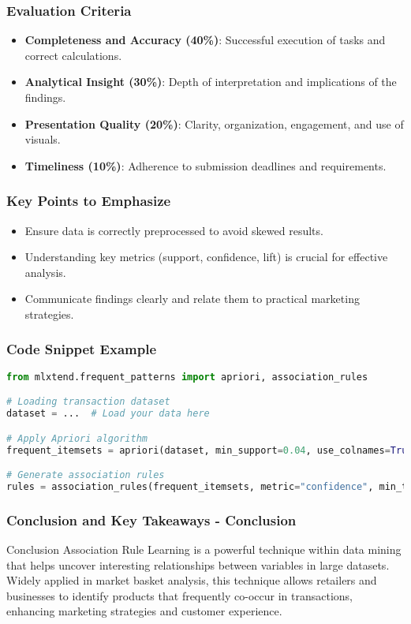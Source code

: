\documentclass[aspectratio=169]{beamer}
\begin{document}
\begin{frame}[fragile]
    \frametitle{Evaluation Criteria}
    \begin{itemize}
        \item \textbf{Completeness and Accuracy (40\%)}: Successful execution of tasks and correct calculations.
        \item \textbf{Analytical Insight (30\%)}: Depth of interpretation and implications of the findings.
        \item \textbf{Presentation Quality (20\%)}: Clarity, organization, engagement, and use of visuals.
        \item \textbf{Timeliness (10\%)}: Adherence to submission deadlines and requirements.
    \end{itemize}
\end{frame}

\begin{frame}[fragile]
    \frametitle{Key Points to Emphasize}
    \begin{itemize}
        \item Ensure data is correctly preprocessed to avoid skewed results.
        \item Understanding key metrics (support, confidence, lift) is crucial for effective analysis.
        \item Communicate findings clearly and relate them to practical marketing strategies.
    \end{itemize}
\end{frame}

\begin{frame}[fragile]
    \frametitle{Code Snippet Example}
    \begin{lstlisting}[language=Python]
from mlxtend.frequent_patterns import apriori, association_rules

# Loading transaction dataset
dataset = ...  # Load your data here

# Apply Apriori algorithm
frequent_itemsets = apriori(dataset, min_support=0.04, use_colnames=True)

# Generate association rules
rules = association_rules(frequent_itemsets, metric="confidence", min_threshold=0.5)
    \end{lstlisting}
\end{frame}

\begin{frame}[fragile]
    \frametitle{Conclusion and Key Takeaways - Conclusion}
    \begin{block}{Conclusion}
        Association Rule Learning is a powerful technique within data mining that helps uncover interesting relationships between variables in large datasets. 
        Widely applied in market basket analysis, this technique allows retailers and businesses to identify products that frequently co-occur in transactions, enhancing marketing strategies and customer experience.
    \end{block}
\end{frame}
\end{document}
